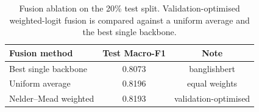 \begin{table}[!htbp]
\centering
\caption{Fusion ablation on the 20\% test split. Validation-optimised weighted-logit fusion is compared against a uniform average and the best single backbone.}
\label{tab:fusion}
\small
\begin{tabular}{@{}lcc@{}}
\toprule
\textbf{Fusion method} & \textbf{Test Macro-F1} & \textbf{Note} \\
\midrule
Best single backbone & 0.8073 & banglishbert \\
Uniform average & 0.8196 & equal weights \\
Nelder–Mead weighted & 0.8193 & validation-optimised \\
\bottomrule
\end{tabular}
\end{table}